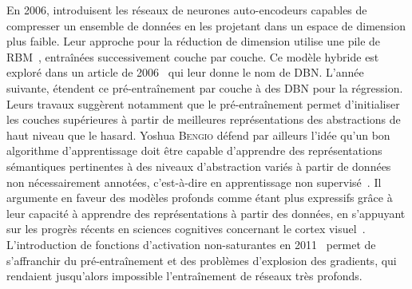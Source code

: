 En 2006, \citet{hinton_reducing_2006} introduisent les réseaux de neurones auto-encodeurs capables de compresser un ensemble de données en les projetant dans un espace de dimension plus faible. Leur approche pour la réduction de dimension utilise une pile de \gls{RBM}~\cite{ackley_learning_1985,salakhutdinov_deep_2009}, entraînées successivement couche par couche. Ce modèle hybride est exploré dans un article de 2006~\cite{hinton_fast_2006} qui leur donne le nom de \gls{DBN}. L'année suivante, \citet{bengio_greedy_2007} étendent ce pré-entraînement par couche à des \gls{DBN} pour la régression. Leurs travaux suggèrent notamment que le pré-entraînement permet d'initialiser les couches supérieures à partir de meilleures représentations des abstractions de haut niveau que le hasard. Yoshua \textsc{Bengio} défend par ailleurs l'idée qu'un bon algorithme d'apprentissage doit être capable d'apprendre des représentations sémantiques pertinentes à des niveaux d'abstraction variés à partir de données non nécessairement annotées, c'est-à-dire en apprentissage non supervisé~\cite{bengio_learning_2009}. Il argumente en faveur des modèles profonds comme étant plus expressifs grâce à leur capacité à apprendre des représentations à partir des données, en s'appuyant sur les progrès récents en sciences cognitives concernant le cortex visuel~\cite{serre_quantitative_2007}. L'introduction de fonctions d'activation non-saturantes en 2011~\cite{glorot_deep_2011} permet de s'affranchir du pré-entraînement et des problèmes d'explosion des gradients, qui rendaient jusqu'alors impossible l'entraînement de réseaux très profonds.

